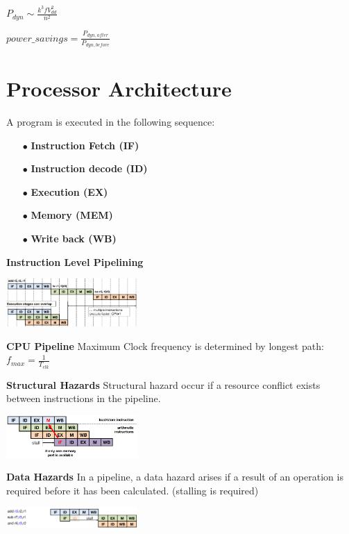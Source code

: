 \documentclass[english]{latex4ei/latex4ei_sheet}
\begin{document}
$P_{dyn} \sim \frac{k^3 f V_{dd}^2}{n^2}$

$power\_savings = \frac{P_{dyn, after}}{P_{dyn, before}}$

\section{Processor Architecture}

A program is executed in the following sequence:
\begin{enumerate}
	\item[$\bullet$] \textbf{Instruction Fetch (IF)}
	\item[$\bullet$] \textbf{Instruction decode (ID)}
	\item[$\bullet$] \textbf{Execution (EX)}
	\item[$\bullet$] \textbf{Memory (MEM)}
	\item[$\bullet$] \textbf{Write back (WB)}
\end{enumerate}

\textbf{Instruction Level Pipelining}
\begin{center}
	\includegraphics[width = 5cm]{images/4.ProcessorArchitecture/ILP.png}
\end{center}

\textbf{CPU Pipeline} Maximum Clock frequency is determined by longest path: $f_{max} = \frac{1}{T_{clk}}$

\textbf{Structural Hazards} Structural hazard occur if a resource conflict exists between instructions in the pipeline.
\begin{center}
	\includegraphics[width = 5cm]{images/4.ProcessorArchitecture/StrHazard.png}
\end{center}

\textbf{Data Hazards} In a pipeline, a data hazard arises if a result of an operation is required before it has been calculated. (stalling is required)
\begin{center}
	\includegraphics[width = 5cm]{images/4.ProcessorArchitecture/DataHazard.png}
\end{center}
\end{document}

